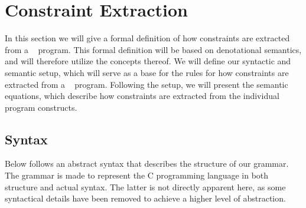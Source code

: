 
\section{Constraint Extraction}\label{extraction}
In this section we will give a formal definition of how constraints are extracted from a \thelang~ program.
This formal definition will be based on denotational semantics, and will therefore utilize the concepts thereof.
We will define our syntactic and semantic setup, which will serve as a base for the rules for how constraints are extracted from a \thelang~ program.
Following the setup, we will present the semantic equations, which describe how constraints are extracted from the individual program constructs.

\subsection{Syntax}
Below follows an abstract syntax that describes the structure of our grammar.
The grammar is made to represent the C programming language in both structure and actual syntax.
The latter is not directly apparent here, as some syntactical details have been removed to achieve a higher level of abstraction.

